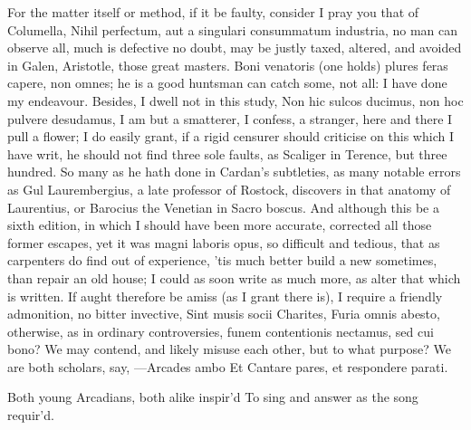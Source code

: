 {For the matter itself or method, if it be faulty, consider I pray you
that of Columella, Nihil perfectum, aut a singulari consummatum
industria, no man can observe all, much is defective no doubt, may be
justly taxed, altered, and avoided in Galen, Aristotle, those great
masters. Boni venatoris (one holds) plures feras capere, non
omnes; he is a good huntsman can catch some, not all: I have done my
endeavour. Besides, I dwell not in this study, Non hic sulcos ducimus,
non hoc pulvere desudamus, I am but a smatterer, I confess, a stranger,
here and there I pull a flower; I do easily grant, if a rigid
censurer should criticise on this which I have writ, he should not find
three sole faults, as Scaliger in Terence, but three hundred. So many
as he hath done in Cardan's subtleties, as many notable errors as
Gul Laurembergius, a late professor of Rostock, discovers in that
anatomy of Laurentius, or Barocius the Venetian in Sacro boscus. And
although this be a sixth edition, in which I should have been more
accurate, corrected all those former escapes, yet it was magni laboris
opus, so difficult and tedious, that as carpenters do find out of
experience, 'tis much better build a new sometimes, than repair an old
house; I could as soon write as much more, as alter that which is
written. If aught therefore be amiss (as I grant there is), I require a
friendly admonition, no bitter invective, Sint musis socii
Charites, Furia omnis abesto, otherwise, as in ordinary controversies,
funem contentionis nectamus, sed cui bono? We may contend, and likely
misuse each other, but to what purpose? We are both scholars, say,
---Arcades ambo
Et Cantare pares, et respondere parati.

Both young Arcadians, both alike inspir'd
To sing and answer as the song requir'd.

}
